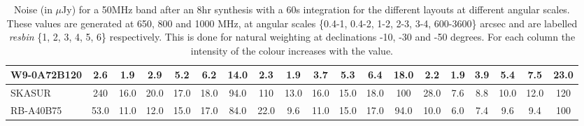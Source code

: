 \begin{table}[!htp]
{{\begin{tabular}{|lcccccc||cccccc||cccccc|}
W9-0A72B120 & 2.6 \cellcolor{blue!18.02} & 1.9 \cellcolor{red!18.30} & 2.9 \cellcolor{green!18.49} & 5.2 \cellcolor{orange!20.03} & 6.2 \cellcolor{purple!20.03} & 14.0 \cellcolor{blue!18.52} & 2.3 \cellcolor{blue!18.04} & 1.9 \cellcolor{red!18.38} & 3.7 \cellcolor{green!19.64} & 5.3 \cellcolor{orange!20.83} & 6.4 \cellcolor{purple!19.74} & 18.0 \cellcolor{blue!18.51} & 2.2 \cellcolor{blue!18.16} & 1.9 \cellcolor{red!18.72} & 3.9 \cellcolor{green!21.17} & 5.4 \cellcolor{orange!22.12} & 7.5 \cellcolor{purple!29.02} & 23.0 \cellcolor{blue!18.43}\\ \hline 
SKASUR & 240 \cellcolor{blue!60.00} & 16.0 \cellcolor{red!60.00} & 20.0 \cellcolor{green!60.00} & 17.0 \cellcolor{orange!60.00} & 18.0 \cellcolor{purple!60.00} & 94.0 \cellcolor{blue!60.00} & 110 \cellcolor{blue!60.00} & 13.0 \cellcolor{red!60.00} & 16.0 \cellcolor{green!60.00} & 15.0 \cellcolor{orange!60.00} & 18.0 \cellcolor{purple!60.00} & 100 \cellcolor{blue!60.00} & 28.0 \cellcolor{blue!60.00} & 7.6 \cellcolor{red!60.00} & 8.8 \cellcolor{green!60.00} & 10.0 \cellcolor{orange!60.00} & 12.0 \cellcolor{purple!60.00} & 120 \cellcolor{blue!60.00}\\ \hline 
RB-A40B75 & 53.0 \cellcolor{blue!26.93} & 11.0 \cellcolor{red!45.21} & 12.0 \cellcolor{green!40.58} & 15.0 \cellcolor{orange!53.23} & 17.0 \cellcolor{purple!56.61} & 84.0 \cellcolor{blue!54.81} & 22.0 \cellcolor{blue!25.71} & 9.6 \cellcolor{red!47.25} & 11.0 \cellcolor{green!43.59} & 15.0 \cellcolor{orange!60.00} & 17.0 \cellcolor{purple!56.53} & 94.0 \cellcolor{blue!56.96} & 10.0 \cellcolor{blue!30.81} & 6.0 \cellcolor{red!48.41} & 7.4 \cellcolor{green!48.91} & 9.6 \cellcolor{orange!56.71} & 9.4 \cellcolor{purple!42.10} & 100 \cellcolor{blue!51.43}\tabularnewline \hline 
\end{tabular}}\hfill 

\caption{Noise (in $\mu$Jy) for a 50MHz band after an 8hr synthesis with a 60s integration for the different layouts at different angular scales. These values are generated at 650, 800 and 1000 MHz, at angular scales \{0.4-1, 0.4-2, 1-2, 2-3, 3-4, 600-3600\} arcsec and are labelled {\it resbin} \{1, 2, 3, 4, 5, 6\} respectively. This is done for natural weighting at declinations -10, -30 and -50 degrees. For each column the intensity of the colour increases with the value.}\label{tab:noise50-new}}
 \end{table}